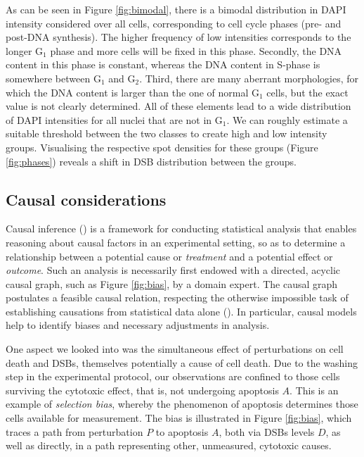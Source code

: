 As can be seen in Figure \ref{fig:bimodal}, there is a bimodal distribution in DAPI intensity considered over all cells, corresponding to cell cycle phases (pre- and post-DNA synthesis). The higher frequency of low intensities corresponds to the longer G$_1$ phase and more cells will be fixed in this phase. Secondly, the DNA content in this phase is constant, whereas the DNA content in S-phase is somewhere between G$_1$ and G$_2$. Third, there are many aberrant morphologies, for which the DNA content is larger than the one of normal G$_1$ cells, but the exact value is not clearly determined. All of these elements lead to a wide distribution of DAPI intensities for all nuclei that are not in G$_1$. We can roughly estimate a suitable threshold between the two classes to create high and low intensity groups. Visualising the respective spot densities for these groups (Figure \ref{fig:phases}) reveals a shift in DSB distribution between the groups.

\subsection{Causal considerations}

Causal inference (\cite{pearl2009causal}) is a framework for conducting statistical analysis that enables reasoning about causal factors in an experimental setting, so as to determine a relationship between a potential cause or \emph{treatment} and a potential effect or \emph{outcome}. Such an analysis is necessarily first endowed with a directed, acyclic causal graph, such as Figure \ref{fig:bias}, by a domain expert. The causal graph postulates a feasible causal relation, respecting the otherwise impossible task of establishing causations from statistical data alone (\cite{pearl2009causal}). In particular, causal models help to identify biases and necessary adjustments in analysis.

One aspect we looked into was the simultaneous effect of perturbations on cell death and DSBs, themselves potentially a cause of cell death. Due to the washing step in the experimental protocol, our observations are confined to those cells surviving the cytotoxic effect, that is, not undergoing apoptosis $A$. This is an example of \emph{selection bias}, whereby the phenomenon of apoptosis determines those cells available for measurement. The bias is illustrated in Figure \ref{fig:bias}, which traces a path from perturbation $P$ to apoptosis $A$, both via DSBs levels $D$, as well as directly, in a path representing other, unmeasured, cytotoxic causes.

